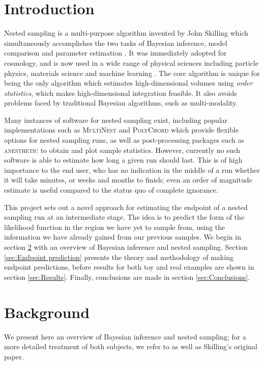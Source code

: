 \documentclass[usenatbib]{mnras}
\begin{document}
\section{Introduction}
Nested sampling is a multi-purpose algorithm invented by John Skilling which simultaneously accomplishes the two tasks of Bayesian inference, model comparison and parameter estimation \citep{skilling}. It was immediately adopted for cosmology, and is now used in a wide range of physical sciences including particle physics, materials science \citep{physical_scientists} and machine learning \citep{split}. The core algorithm is unique for being the only algorithm which estimates high-dimensional volumes using \textit{order statistics}, which makes high-dimensional integration feasible. It also avoids problems faced by traditional Bayesian algorithms, such as multi-modality.
\par
Many instances of software for nested sampling exist, including popular implementations such as \textsc{MultiNest} \citep{multinest} and \textsc{PolyChord} \citep{polychord} which provide flexible options for nested sampling runs, as well as post-processing packages such as \textsc{anesthetic} \citep{anesthetic} to obtain and plot sample statistics. However, currently no such software is able to estimate how long a given run should last. This is of high importance to the end user, who has no indication in the middle of a run whether it will take minutes, or weeks and months to finish; even an order of magnitude estimate is useful compared to the status quo of complete ignorance.
\par
This project sets out a novel approach for estimating the endpoint of a nested sampling run at an intermediate stage. The idea is to predict the form of the likelihood function in the region we have yet to sample from, using the information we have already gained from our previous samples. We begin in section \ref{sec:Background} with an overview of Bayesian inference and nested sampling. Section \ref{sec:Endpoint prediction} presents the theory and methodology of making endpoint predictions, before results for both toy and real examples are shown in section \ref{sec:Results}. Finally, conclusions are made in section \ref{sec:Conclusions}.  


\section{Background}\label{sec:Background}
\prntlen{\textwidth}
We present here an overview of Bayesian inference and nested sampling; for a more detailed treatment of both subjects, we refer to \citet{sivia} as well as Skilling's original paper. 
\end{document}
